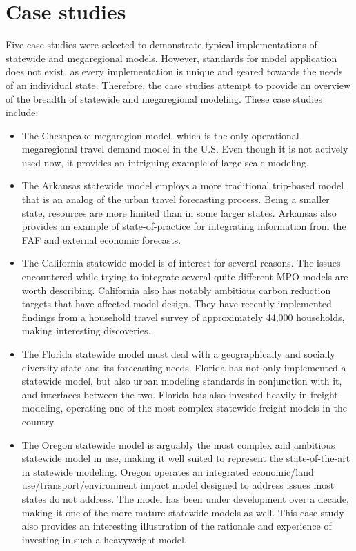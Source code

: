 \chapter{Case studies}\label{sec:case-studies}

Five case studies were selected to demonstrate typical implementations of statewide and megaregional models. However, standards for model application does not exist, as every implementation is unique and geared towards the needs of an individual state. Therefore, the case studies attempt to provide an overview of the breadth of statewide and megaregional modeling. These case studies include:

\begin{itemize}
\item
The Chesapeake megaregion model, which is the only operational megaregional travel demand model in the U.S. Even though it is not actively used now, it provides an intriguing example of large-scale modeling.
\item
The Arkansas statewide model employs a more traditional trip-based model that is an analog of the urban travel forecasting process. Being a smaller state, resources are more limited than in some larger states. Arkansas also provides an example of state-of-practice for integrating information from the FAF and external economic forecasts.
\item
The California statewide model is of interest for several reasons. The issues encountered while trying to integrate several quite different MPO models are worth describing. California also has notably ambitious carbon reduction targets that have affected model design. They have recently implemented findings from a household travel survey of approximately 44,000 households, making interesting discoveries.
\item
The Florida statewide model must deal with a geographically and socially diversity state and its forecasting needs. Florida has not only implemented a statewide model, but also urban modeling standards in conjunction with it, and interfaces between the two. Florida has also invested heavily in freight modeling, operating one of the most complex statewide freight models in the country.
\item
The Oregon statewide model is arguably the most complex and ambitious statewide model in use, making it well suited to represent the state-of-the-art in statewide modeling. Oregon operates an integrated economic/land use/transport/environment impact model designed to address issues most states do not address. The model has been under development over a decade, making it one of the more mature statewide models as well. This case study also provides an interesting illustration of the rationale and experience of investing in such a heavyweight model.
\end{itemize}

